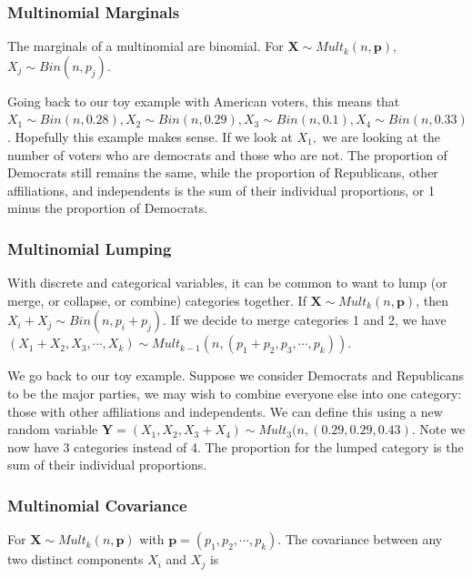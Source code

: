 \documentclass[
]{book}
\begin{document}
\hypertarget{multinomial-marginals}{%
\subsubsection{Multinomial Marginals}\label{multinomial-marginals}}

The marginals of a multinomial are binomial. For \(\boldsymbol{X} \sim Mult_k(n, \boldsymbol{p})\), \(X_j \sim Bin(n, p_j)\).

Going back to our toy example with American voters, this means that \(X_1 \sim Bin(n,0.28), X_2 \sim Bin(n,0.29), X_3 \sim Bin(n, 0.1), X_4 \sim Bin(n,0.33)\). Hopefully this example makes sense. If we look at \(X_1,\) we are looking at the number of voters who are democrats and those who are not. The proportion of Democrats still remains the same, while the proportion of Republicans, other affiliations, and independents is the sum of their individual proportions, or 1 minus the proportion of Democrats.

\hypertarget{multinomial-lumping}{%
\subsubsection{Multinomial Lumping}\label{multinomial-lumping}}

With discrete and categorical variables, it can be common to want to lump (or merge, or collapse, or combine) categories together. If \(\boldsymbol{X} \sim Mult_k(n, \boldsymbol{p})\), then \(X_i + X_j \sim Bin(n, p_i + p_j)\). If we decide to merge categories 1 and 2, we have \((X_1 + X_2, X_3, \cdots, X_k) \sim Mult_{k-1}(n, (p_1 + p_2, p_3, \cdots, p_k))\).

We go back to our toy example. Suppose we consider Democrats and Republicans to be the major parties, we may wish to combine everyone else into one category: those with other affiliations and independents. We can define this using a new random variable \(\boldsymbol{Y} = (X_1, X_2, X_3+X_4) \sim Mult_3(n,(0.29,0.29,0.43)\). Note we now have 3 categories instead of 4. The proportion for the lumped category is the sum of their individual proportions.

\hypertarget{multinomial-covariance}{%
\subsubsection{Multinomial Covariance}\label{multinomial-covariance}}

For \(\boldsymbol{X} \sim Mult_k(n, \boldsymbol{p})\) with \(\boldsymbol{p} = (p_1,p_2, \cdots, p_k)\). The covariance between any two distinct components \(X_i\) and \(X_j\) is
\end{document}
